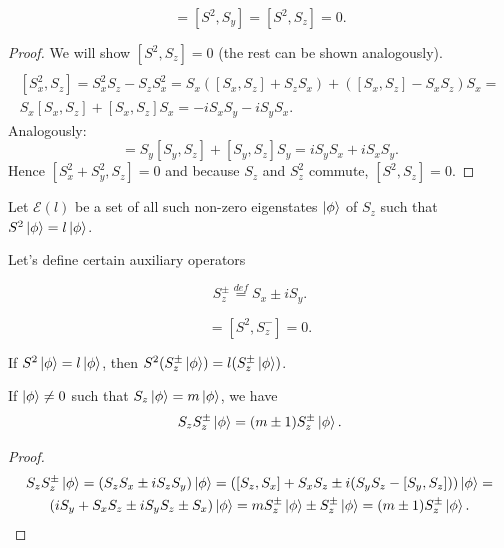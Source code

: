 \documentclass[main.tex]{subfiles}
\begin{document}
\begin{fact}
\begin{equation}
[S^2, S_x] = [S^2, S_y] = [S^2, S_z] = 0. 
\end{equation}
\begin{proof}
We will show $[S^2, S_z] = 0$ (the rest can be shown analogously).
\begin{multline*}
\\
[S_x^2, S_z] =
S_x^2 S_z - S_z S^2_x = S_x([S_x, S_z] + S_z S_x) + ([S_x, S_z] - S_x S_z)S_x = \\
S_x[S_x, S_z] + [S_x, S_z]S_x = -iS_x S_y - i S_y S_x.
\end{multline*}
Analogously:
\begin{equation}
[S_y^2, S_z] =
S_y[S_y, S_z] + [S_y, S_z]S_y = iS_y S_x + i S_x S_y.
\end{equation}
Hence $[S_x^2 + S_y^2, S_z] = 0$ and because $S_z$ and $S^2_z$ commute, $[S^2, S_z] = 0$.

\end{proof}
\end{fact}
\begin{definition}
Let $\mathcal{E}(l)$ be a set of all such non-zero eigenstates 
$\ket{\phi}$ 
of $S_z$ 
such that $S^2 \ket{\phi} = l \ket{\phi}$.    
\end{definition}

Let's define certain auxiliary operators

\begin{definition}
\begin{equation}
S_z^\pm  \stackrel{def}{=} S_x \pm iS_y.
\end{equation}
\end{definition}

\begin{corollary}
\begin{equation}
[S^2, S^{+}_z] = [S^2, S^{-}_z] = 0.
\end{equation}
\end{corollary}

\begin{corollary}
\label{spin-create-anihilate-in-space}
If $S^2\ket{\phi} = l \ket{\phi}$, then $S^2(S^{\pm}_z\ket{\phi}) = l(S^{\pm}_z\ket{\phi})$.  
\end{corollary}

\begin{fact}
If $\ket{\phi} \not= 0$ such that $S_z\ket{\phi} = m\ket{\phi}$, we have
\begin{equation}
S_z S_z^\pm \ket{\phi} = (m \pm 1) S_z^\pm \ket{\phi}.
\end{equation}
\end{fact}
\begin{proof}
\begin{multline*}
S_z S_z^\pm \ket{\phi} = (S_zS_x \pm iS_zS_y) \ket{\phi}
= ([S_z, S_x] + S_x S_z \pm i(S_y S_z - [S_y, S_z])) \ket{\phi} = \\
(iS_y + S_x S_z \pm iS_y S_z \pm S_x) \ket{\phi} = mS^{\pm}_z \ket{\phi} \pm S^{\pm}_z \ket{\phi} = (m \pm 1) S_z^\pm \ket{\phi}.\\
\end{multline*}
\end{proof}
\end{document}
